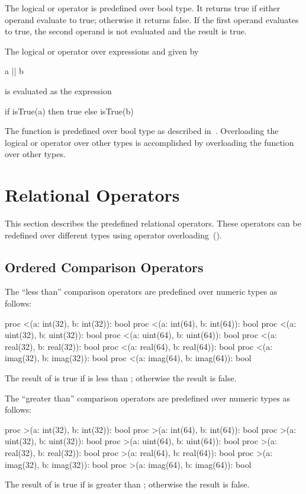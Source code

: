 The logical or operator is predefined over bool type.  It returns
true if either operand evaluate to true; otherwise it returns false.
If the first operand evaluates to true, the second operand is not
evaluated and the result is true.

The logical or operator over expressions  and  given
by
\begin{chapel}
a || b
\end{chapel}
is evaluated as the expression
\begin{chapel}
if isTrue(a) then true else isTrue(b)
\end{chapel}

The function  is predefined over bool type as described
in~.  Overloading the logical or operator
over other types is accomplished by overloading the 
function over other types.

\section{Relational Operators}
\label{Relational_Operators}

This section describes the predefined relational operators.  These
operators can be redefined over different types using operator
overloading~().

\subsection{Ordered Comparison Operators}
\label{Ordered_Comparison_Operators}

The ``less than'' comparison operators are predefined over numeric
types as follows:
\begin{chapel}
proc <(a: int(32), b: int(32)): bool
proc <(a: int(64), b: int(64)): bool
proc <(a: uint(32), b: uint(32)): bool
proc <(a: uint(64), b: uint(64)): bool
proc <(a: real(32), b: real(32)): bool
proc <(a: real(64), b: real(64)): bool
proc <(a: imag(32), b: imag(32)): bool
proc <(a: imag(64), b: imag(64)): bool
\end{chapel}
The result of  is true if  is less than ;
otherwise the result is false.

The ``greater than'' comparison operators are predefined over numeric
types as follows:
\begin{chapel}
proc >(a: int(32), b: int(32)): bool
proc >(a: int(64), b: int(64)): bool
proc >(a: uint(32), b: uint(32)): bool
proc >(a: uint(64), b: uint(64)): bool
proc >(a: real(32), b: real(32)): bool
proc >(a: real(64), b: real(64)): bool
proc >(a: imag(32), b: imag(32)): bool
proc >(a: imag(64), b: imag(64)): bool
\end{chapel}
The result of  is true if  is greater
than ; otherwise the result is false.

